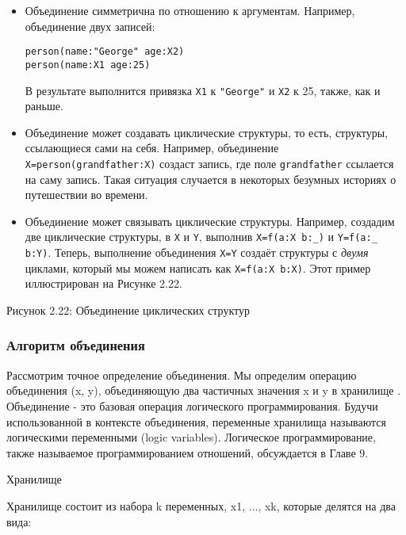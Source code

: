 \begin{itemize}
\item{Объединение симметрична по отношению к аргументам. Например, объединение двух записей:

  \begin{lstlisting}
person(name:"George" age:X2)
person(name:X1 age:25)
  \end{lstlisting}
  
В результате выполнится привязка \lstinline!X1! к \lstinline!"George"! и \lstinline!X2! к 25, также, как и раньше.}

\item{Объединение может создавать циклические структуры, то есть, структуры, ссылающиеся сами на себя. Например, объединение \lstinline!X=person(grandfather:X)! создаст запись, где поле \lstinline!grandfather! ссылается на саму запись. Такая ситуация случается в некоторых безумных историях о путешествии во времени.}

\item{Объединение может связывать циклические структуры. Например, создадим две циклические структуры, в \lstinline!X! и \lstinline!Y!, выполнив \lstinline!X=f(a:X b:_)! и \lstinline!Y=f(a:_ b:Y)!. Теперь, выполнение объединения \lstinline!X=Y! создаёт структуры с \emph{двумя} циклами, который мы можем написать как \lstinline!X=f(a:X b:X)!. Этот пример иллюстрирован на Рисунке 2.22.}
\end{itemize}

Рисунок 2.22: Объединение циклических структур


\subsubsection{Алгоритм объединения}

Рассмотрим точное определение объединения. Мы определим операцию объединения (x, y), объединяющую два частичных значения x и y в хранилище . Объединение - это базовая операция логического программирования. Будучи использованной в контексте объединения, переменные хранилища называются логическими переменными (logic variables). Логическое программирование, также называемое программированием отношений, обсуждается в Главе 9.

Хранилище

Хранилище состоит из набора k переменных, x1, ..., xk, которые делятся на два вида:

